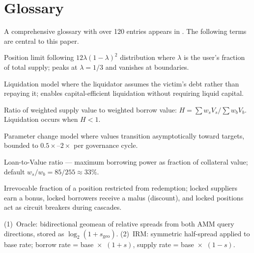 \documentclass[10pt,a4paper,twocolumn]{article}
\theoremstyle{definition}
\theoremstyle{plain}
\theoremstyle{remark}
\begin{document}
\section*{Glossary}
\label{sec:glossary}

\noindent A comprehensive glossary with over 120 entries appears in \cite[Part~III]{apx}. The following terms are central to this paper.

\begin{description}[leftmargin=!,labelwidth=2.5cm]
    \item[Beta Cap] Position limit following \mbox{$12\lambda(1-\lambda)^2$} distribution where $\lambda$ is the user's fraction of total supply; peaks at $\lambda = 1/3$ and vanishes at boundaries.

    \item[Debt Assumption] Liquidation model where the liquidator assumes the victim's debt rather than repaying it; enables capital-efficient liquidation without requiring liquid capital.

    \item[Health Factor] Ratio of weighted supply value to weighted borrow value: $H = \sum w_s V_s / \sum w_b V_b$. Liquidation occurs when $H < 1$.

    \item[Lethargic Governance] Parameter change model where values transition asymptotically toward targets, bounded to $0.5\times$--$2\times$ per governance cycle.

    \item[LTV] Loan-to-Value ratio --- maximum borrowing power as fraction of collateral value; default $w_s/w_b = 85/255 \approx 33\%$.

    \item[Position Lock] Irrevocable fraction of a position restricted from redemption; locked suppliers earn a bonus, locked borrowers receive a malus (discount), and locked positions act as circuit breakers during cascades.

    \item[Spread] (1)~Oracle: bidirectional geomean of relative spreads from both AMM query directions, stored as $\log_2(1 + s_{\text{geo}})$. (2)~IRM: symmetric half-spread applied to base rate; borrow rate = base~$\times$~$(1{+}s)$, supply rate = base~$\times$~$(1{-}s)$.


\end{description}
\end{document}
